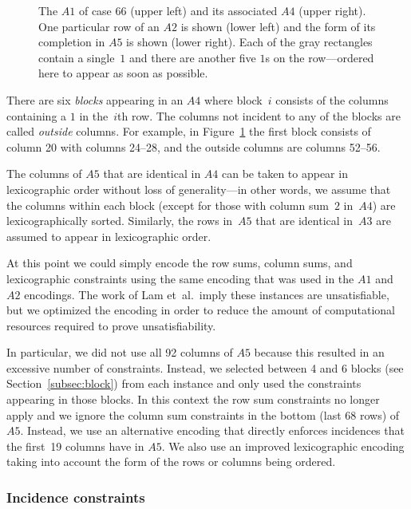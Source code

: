 \documentclass[letterpaper]{article}
\begin{document}
\begin{figure}

\caption{The $A1$ of case 66 (upper left) and its associated $A4$ (upper right).
One particular row of an $A2$ is shown (lower left) and the form of
its completion in $A5$ is shown (lower right).  Each of the gray
rectangles contain a single~$1$ and there are another five $1$s
on the row---ordered here to appear as soon as possible.}\label{fig:a1a4}
\end{figure}

There are six \emph{blocks} appearing in an $A4$
where block~$i$ consists of the columns containing a $1$ in
the~$i$th row.
The columns not incident to any of the blocks
are called \emph{outside} columns.
For example, in Figure~\ref{fig:a1a4} the first block
consists of column 20 with columns 24--28, and the outside columns
are columns 52--56.

The columns of $A5$ that are identical in $A4$ can be taken
to appear in lexicographic order without loss of generality---in
other words, we assume that the columns within each block
(except for those with column sum~$2$ in~$A4$)
are lexicographically sorted.
Similarly, the rows in~$A5$ that are identical in~$A3$ are
assumed to appear in lexicographic order.

At this point we could simply encode the row sums, column sums,
and lexicographic constraints using the same encoding that
was used in the $A1$ and $A2$ encodings.
The work of Lam et~al.~imply these instances
are unsatisfiable, but we optimized the
encoding in order to reduce the amount of computational resources required
to prove unsatisfiability.

In particular, we did not use all 92 columns of $A5$ because this resulted in an
excessive number of constraints.  Instead, we selected
between 4 and 6 blocks (see Section~\ref{subsec:block})
from each instance and only used the constraints appearing
in those blocks.  In this context
the row sum constraints no longer apply and we ignore
the column sum constraints in the bottom (last 68 rows) of $A5$.
Instead, we use an alternative encoding that directly
enforces incidences that the first~19 columns have in $A5$.
We also use an improved lexicographic encoding taking into account
the form of the rows or columns being ordered.

\subsubsection{Incidence constraints}
\end{document}
